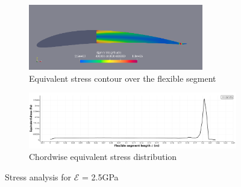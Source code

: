 \begin{figure}[hbt!]
\centering
\begin{subfigure}{.6\textwidth}
   \includegraphics[width=3in]{Figures/sigma.png}
     \caption{\label{fig:stress} Equivalent stress contour over the flexible segment}
\end{subfigure}
\begin{subfigure}{.8\textwidth}
    \includegraphics[width=5in]{Figures/equivalent stress.png}
  \caption{Chordwise equivalent stress distribution\label{fig:stress2.5GPa}}
\end{subfigure}
\caption{\label{fig:displ} Stress analysis for $\mathcal{E}$ = 2.5GPa }
  \end{figure}







